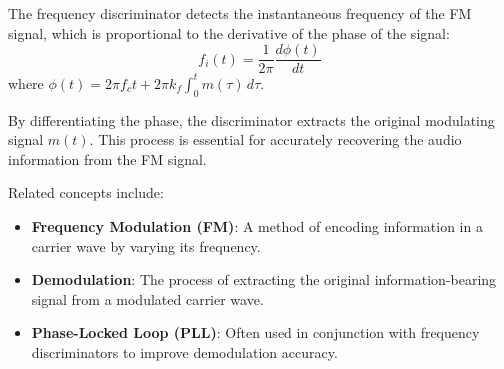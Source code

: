 The frequency discriminator detects the instantaneous frequency of the FM signal, which is proportional to the derivative of the phase of the signal:
\[ f_i(t) = \frac{1}{2\pi} \frac{d\phi(t)}{dt} \]
where \( \phi(t) = 2\pi f_c t + 2\pi k_f \int_0^t m(\tau) \, d\tau \).

By differentiating the phase, the discriminator extracts the original modulating signal \( m(t) \). This process is essential for accurately recovering the audio information from the FM signal.

Related concepts include:
\begin{itemize}
    \item \textbf{Frequency Modulation (FM)}: A method of encoding information in a carrier wave by varying its frequency.
    \item \textbf{Demodulation}: The process of extracting the original information-bearing signal from a modulated carrier wave.
    \item \textbf{Phase-Locked Loop (PLL)}: Often used in conjunction with frequency discriminators to improve demodulation accuracy.
\end{itemize}

